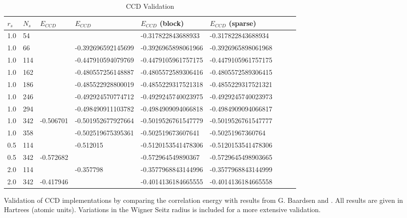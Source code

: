 \begin{table}[h]
\caption{CCD Validation}
\begin{center}
\begin{threeparttable}
\begin{tabular}{l l l l l l l l l}
    \toprule
$r_s$ & $N_s$ & $E_{CCD}$ \cite{Roggero2013} & $E_{CCD}$ \cite{Baardsen2014, Baardsen2015} & $E_{CCD}$ (block) & $E_{CCD}$ (sparse)& \\ \hline
1.0 &54 & & &-0.317822843688933 & -0.317822843688934\\
1.0 &66 & & -0.392696592145699  &-0.3926965898061966 &-0.3926965898061968 \\
 1.0 &114 & & -0.447910594079769 &-0.4479105961757175 & -0.4479105961757175\\
1.0 &162  & & -0.480557256148887 &-0.4805572589306416 &-0.4805572589306415 \\
1.0 &186 & &-0.485522928800019 &-0.4855229317521318 &-0.4855229317521321 \\
1.0 & 246 &  &-0.492924570774712&-0.4929245740023975 & -0.4929245740023973\\
1.0 & 294 & &-0.498490911103782 & -0.4984909094066818 &-0.4984909094066817 \\
1.0 & 342 & -0.506701& -0.501952677927664 &  -0.5019526761547779 &-0.5019526761547777 \\
1.0 & 358 & &-0.502519675395361 & -0.502519673607641 &-0.50251967360764 \\ \hline
0.5 & 114 & &-0.512015  & -0.5120153541478306 & -0.5120153541478306 \\ 
0.5 & 342 & -0.572682 & & -0.572964549890367 &-0.5729645498903665 &  \\ \hline
2.0 & 114 &  & -0.357798  & -0.3577968843144996 &-0.3577968843144999 \\
2.0 & 342 & -0.417946 & & -0.4014136184665555&-0.4014136184665558 & \\
\bottomrule
\end{tabular}
\begin{tablenotes}
Validation of CCD implementations by comparing the correlation energy with results from G. Baardsen \cite[table 5.2]{Baardsen2014} and \cite{Baardsen2015}. All results are given in Hartrees (atomic units). Variations in the Wigner Seitz radius is included for a more extensive validation.
\end{tablenotes}
\end{threeparttable}
\end{center}
\label{tab:ccd_valid}
\end{table}

